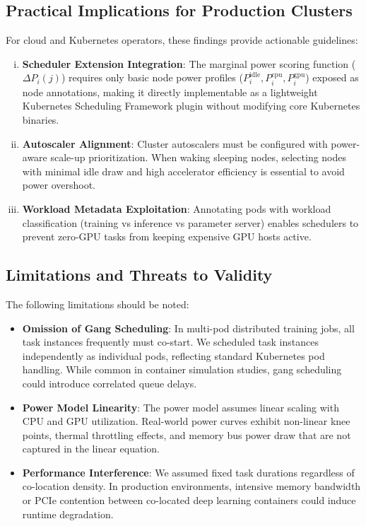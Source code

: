 \documentclass[a4paper,fleqn]{cas-dc}
\begin{document}
\subsection{Practical Implications for Production Clusters}
For cloud and Kubernetes operators, these findings provide actionable guidelines:
\begin{enumerate}[(i)]
    \item \textbf{Scheduler Extension Integration}: The marginal power scoring function ($\Delta P_i(j)$) requires only basic node power profiles ($P_i^{\mathrm{idle}}, P_i^{\mathrm{cpu}}, P_i^{\mathrm{gpu}}$) exposed as node annotations, making it directly implementable as a lightweight Kubernetes Scheduling Framework plugin \citep{rejiba2022custom} without modifying core Kubernetes binaries.
    \item \textbf{Autoscaler Alignment}: Cluster autoscalers must be configured with power-aware scale-up prioritization. When waking sleeping nodes, selecting nodes with minimal idle draw and high accelerator efficiency is essential to avoid power overshoot.
    \item \textbf{Workload Metadata Exploitation}: Annotating pods with workload classification (training vs inference vs parameter server) enables schedulers to prevent zero-GPU tasks from keeping expensive GPU hosts active.
\end{enumerate}

\subsection{Limitations and Threats to Validity}
The following limitations should be noted:
\begin{itemize}
    \item \textbf{Omission of Gang Scheduling}: In multi-pod distributed training jobs, all task instances frequently must co-start. We scheduled task instances independently as individual pods, reflecting standard Kubernetes pod handling. While common in container simulation studies, gang scheduling could introduce correlated queue delays.
    \item \textbf{Power Model Linearity}: The power model assumes linear scaling with CPU and GPU utilization. Real-world power curves exhibit non-linear knee points, thermal throttling effects, and memory bus power draw that are not captured in the linear equation.
    \item \textbf{Performance Interference}: We assumed fixed task durations regardless of co-location density. In production environments, intensive memory bandwidth or PCIe contention between co-located deep learning containers could induce runtime degradation.
\end{itemize}
\end{document}
